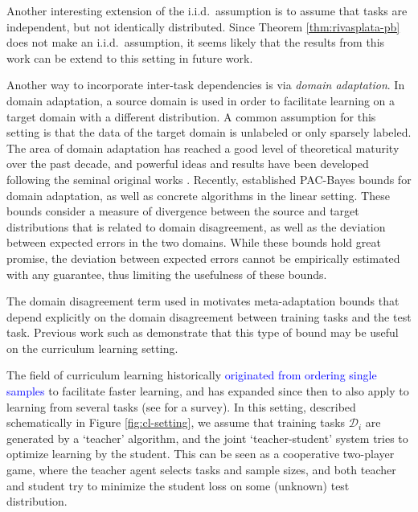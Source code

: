 \documentclass{article}
\theoremstyle{definition}
\newcommand{\LFe}[1]{\textcolor{blue}{#1}}
\begin{document}
Another interesting extension of the i.i.d.\ assumption is to assume that tasks are independent, but not identically distributed. Since Theorem \ref{thm:rivasplata-pb} \citep{Rivasplata2020} does not make an i.i.d.\ assumption, it seems likely that the results from this work can be extend to this setting in future work.

Another way to incorporate inter-task dependencies is via \emph{domain adaptation}. In domain adaptation, a source domain is used in order to facilitate learning on a target domain with a different distribution. A common assumption for this setting is that the data of the target domain is unlabeled or only sparsely labeled. 
The area of domain adaptation has reached a good level of theoretical maturity over the past
decade, and powerful ideas and results have been developed following the seminal original works \citep{Ben-David2010, Mansour2009}. Recently, \citet{Germain2020} established PAC-Bayes bounds for domain adaptation, as well as concrete algorithms in the linear setting. 
These bounds consider a measure of divergence between the source and target distributions that is related to domain disagreement, as well as the deviation between expected errors in the two domains. While these bounds hold great promise, the deviation between expected errors cannot be empirically estimated with any guarantee, thus limiting the usefulness of these bounds.

The domain disagreement term used in \citet{Germain2020} motivates meta-adaptation bounds that depend explicitly on the domain disagreement between training tasks and the test task. Previous work such as \citet{Pentina2015} demonstrate that this type of bound may be useful on the curriculum learning setting.

The field of curriculum learning \citep{Bengio2009} historically \LFe{originated from ordering single samples} to facilitate faster learning, and has expanded since then to also apply to learning from several tasks (see \citet{Soviany2021} for a survey). In this setting, described schematically in Figure \ref{fig:cl-setting}, we assume that training tasks $\mathcal{D}_i$ are generated by a `teacher' algorithm, and the joint `teacher-student' system tries to optimize learning by the student. This can be seen as a cooperative two-player game, where the teacher agent selects tasks and sample sizes, and both teacher and student try to minimize the student loss on some (unknown) test distribution. 
\end{document}
